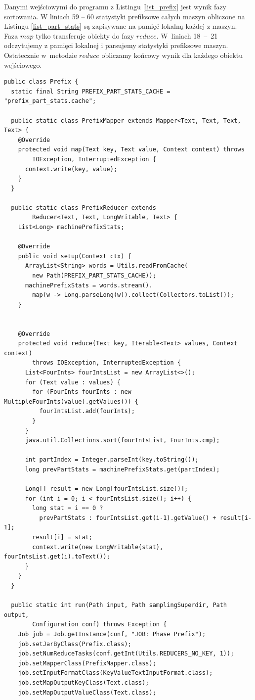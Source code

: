 \documentclass[magisterska]{pracamgr}
\begin{document}
Danymi wejściowymi do programu z Listingu \ref{list_prefix} jest wynik fazy sortowania. W liniach 59 -- 60 statystyki prefiksowe całych maszyn obliczone na Listingu \ref{list_part_stats} są zapisywane na pamięć lokalną każdej z maszyn. Faza \(map\) tylko transferuje obiekty do fazy \(reduce\). W~liniach \mbox{18 -- 21} odczytujemy z pamięci lokalnej i parsujemy statystyki prefiksowe maszyn. Ostatecznie w~metodzie \(reduce\) obliczamy końcowy wynik dla każdego obiektu wejściowego.

\begin{lstlisting}[language=SmallJava,firstnumber=1,label=list_prefix,caption=Ostatnia faza liczenia statystyk prefiksowych]
public class Prefix {
  static final String PREFIX_PART_STATS_CACHE = "prefix_part_stats.cache";

  public static class PrefixMapper extends Mapper<Text, Text, Text, Text> {
    @Override
    protected void map(Text key, Text value, Context context) throws     
        IOException, InterruptedException {
      context.write(key, value);
    }
  }

  public static class PrefixReducer extends
        Reducer<Text, Text, LongWritable, Text> {
    List<Long> machinePrefixStats;
    
    @Override
    public void setup(Context ctx) {
      ArrayList<String> words = Utils.readFromCache(
        new Path(PREFIX_PART_STATS_CACHE));
      machinePrefixStats = words.stream().
        map(w -> Long.parseLong(w)).collect(Collectors.toList());
    }


    @Override
    protected void reduce(Text key, Iterable<Text> values, Context context) 
        throws IOException, InterruptedException {
      List<FourInts> fourIntsList = new ArrayList<>();
      for (Text value : values) {
        for (FourInts fourInts : new MultipleFourInts(value).getValues()) {
          fourIntsList.add(fourInts);
        }
      }
      java.util.Collections.sort(fourIntsList, FourInts.cmp);

      int partIndex = Integer.parseInt(key.toString());
      long prevPartStats = machinePrefixStats.get(partIndex);

      Long[] result = new Long[fourIntsList.size()];
      for (int i = 0; i < fourIntsList.size(); i++) {
        long stat = i == 0 ?
          prevPartStats : fourIntsList.get(i-1).getValue() + result[i-1];
        result[i] = stat;
        context.write(new LongWritable(stat), fourIntsList.get(i).toText());
      }
    }
  }

  public static int run(Path input, Path samplingSuperdir, Path output, 
        Configuration conf) throws Exception {
    Job job = Job.getInstance(conf, "JOB: Phase Prefix");
    job.setJarByClass(Prefix.class);
    job.setNumReduceTasks(conf.getInt(Utils.REDUCERS_NO_KEY, 1));
    job.setMapperClass(PrefixMapper.class);
    job.setInputFormatClass(KeyValueTextInputFormat.class);
    job.setMapOutputKeyClass(Text.class);
    job.setMapOutputValueClass(Text.class);


\end{lstlisting}
\end{document}
